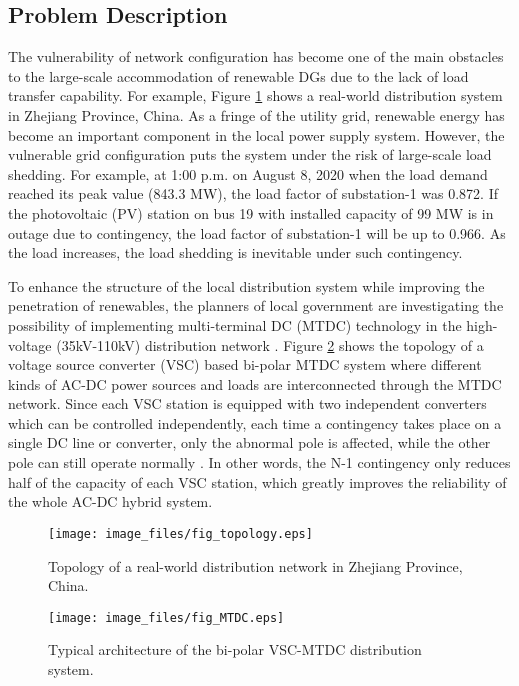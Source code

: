 \documentclass[a4paper,fleqn]{cas-dc}
\begin{document}
\subsection{Problem Description}

The vulnerability of network configuration has become one of the main 
obstacles to the large-scale accommodation of renewable DGs due to the lack 
of load transfer capability. For example,
Figure \ref{fig_topology} shows a real-world distribution system in 
Zhejiang Province, China. As a fringe of the utility grid, renewable energy has 
become an important component in the local power supply system. However, the 
vulnerable grid configuration puts the system under the risk of large-scale load 
shedding. For example, at 1:00 p.m. on August 8, 2020 when the load demand reached
its peak value (843.3 MW), the load factor of substation-1 was 0.872. 
If the photovoltaic (PV) station on bus 19 with installed capacity of 99 MW 
is in outage due to contingency, the load factor of substation-1 will be up to 
0.966. As the load increases, the load shedding is inevitable under such 
contingency.

To enhance the structure of the local distribution system while improving 
the penetration of renewables, the planners of local government are 
investigating the possibility of implementing multi-terminal DC (MTDC) 
technology in the high-voltage (35kV-110kV) distribution network 
\cite{Wang_2021_Unified}. Figure \ref{fig_MTDC} shows the topology of a 
voltage source converter (VSC) based bi-polar MTDC system where different 
kinds of AC-DC power sources and loads are interconnected through the MTDC 
network. Since each VSC station is equipped with two independent converters
which can be controlled independently, each time a contingency takes place 
on a single DC line or converter, only the abnormal pole is affected, while 
the other pole can still operate normally \cite{Li_2019_Hybrid}.
In other words, the N-1 contingency only reduces half of the capacity of each 
VSC station, which greatly improves the reliability of the whole AC-DC hybrid
system.

\begin{figure}[!t]
    \centering
    \texttt{[image: image\_files/fig\_topology.eps]}
    \caption{\textrm{Topology of a real-world distribution network in Zhejiang 
    Province, China.}}
    \label{fig_topology}
\end{figure}
\begin{figure}[!t]
    \centering
    \texttt{[image: image\_files/fig\_MTDC.eps]}
    \caption{\textrm{{\color{blue}Typical architecture of the bi-polar VSC-MTDC 
    distribution system.}}}
    \label{fig_MTDC}
\end{figure}
\end{document}
